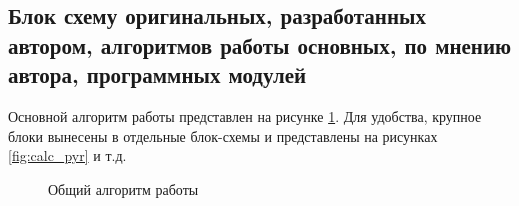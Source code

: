 \subsection{Блок схему оригинальных, разработанных автором, алгоритмов работы основных, по мнению автора, программных модулей}
Основной алгоритм работы представлен на рисунке \ref{fig:lucas_kanade_alg}. Для удобства, крупное блоки вынесены в отдельные блок-схемы и представлены на рисунках \ref{fig:calc_pyr} и т.д. 
\begin{figure}
\caption{Общий алгоритм работы}
\label{fig:lucas_kanade_alg}
\end{figure}

